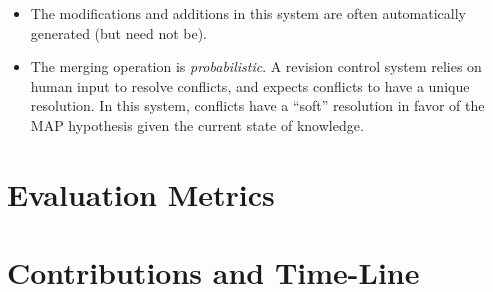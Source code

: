 \documentclass{article}
\begin{document}
\begin{itemize}
\item The modifications and additions in this system are often
  automatically generated (but need not be).
\item The merging operation is {\em probabilistic}.  A revision
  control system relies on human input to resolve conflicts, and
  expects conflicts to have a unique resolution.  In this system,
  conflicts have a ``soft'' resolution in favor of the MAP hypothesis
  given the current state of knowledge.
\end{itemize}


\section{Evaluation Metrics}
\label{sec:eval}

\section{Contributions and Time-Line}
\label{sec:contrib}



\end{document}
